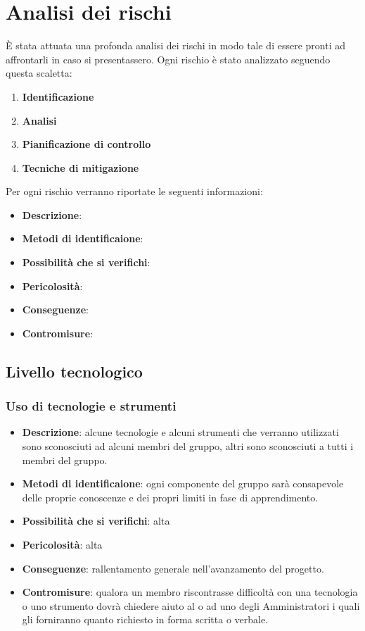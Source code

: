 \section{Analisi dei rischi} 
	È stata attuata una profonda analisi dei rischi in modo tale di essere pronti ad affrontarli in caso si presentassero.
	Ogni rischio è stato analizzato seguendo questa scaletta:
	\begin{enumerate}
		\item \textbf{Identificazione}
		\item \textbf{Analisi}
		\item \textbf{Pianificazione di controllo}
		\item \textbf{Tecniche di mitigazione}
	\end{enumerate}
	Per ogni rischio verranno riportate le seguenti informazioni:
	\begin{itemize}
		\item \textbf{Descrizione}:
		\item \textbf{Metodi di identificaione}:
		\item \textbf{Possibilità che si verifichi}:
		\item \textbf{Pericolosità}:
		\item \textbf{Conseguenze}:
		\item \textbf{Contromisure}:
	\end{itemize}
	
	\subsection{Livello tecnologico}
		\subsubsection{Uso di tecnologie e strumenti}
		\begin{itemize}
			\item \textbf{Descrizione}: alcune tecnologie e alcuni strumenti che verranno utilizzati sono sconosciuti ad alcuni membri del gruppo, altri sono sconosciuti a tutti i membri del gruppo. 
			\item \textbf{Metodi di identificaione}: ogni componente del gruppo sarà consapevole delle proprie conoscenze e dei propri limiti in fase di apprendimento.
			\item \textbf{Possibilità che si verifichi}: alta
			\item \textbf{Pericolosità}: alta
			\item \textbf{Conseguenze}: rallentamento generale nell'avanzamento del progetto.
			\item \textbf{Contromisure}: qualora un membro riscontrasse difficoltà con una tecnologia o uno strumento dovrà chiedere aiuto al \RES{} o ad uno degli Amministratori i quali gli forniranno quanto richiesto in forma scritta o verbale.
		\end{itemize}	
		
